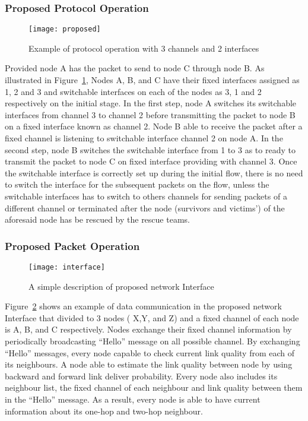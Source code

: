 \documentclass{article}
\begin{document}
\subsubsection{Proposed Protocol Operation}

\begin{center}
\begin{figure}[h]
\texttt{[image: proposed]}
\caption{Example of protocol operation with 3 channels and 2 interfaces}\label{proposed}
\end{figure}
\end{center}

Provided node A has the packet to send to node C through node B. As illustrated in Figure~\ref{proposed}, Nodes A, B, and C have their fixed interfaces assigned as 1, 2 and 3 and switchable interfaces on each of the nodes as 3, 1 and 2 respectively on the initial stage. In the first step, node A switches its switchable interfaces from channel 3 to channel 2 before transmitting the packet to node B on a fixed interface known as channel 2. Node B able to receive the packet after a fixed channel is listening to switchable interface channel 2 on node A. In the second step, node B switches the switchable interface from 1 to 3 as to ready to transmit the packet to node C on fixed interface providing with channel 3. Once the switchable interface is correctly set up during the initial flow, there is no need to switch the interface for the subsequent packets on the flow, unless the switchable interfaces has to switch to others channels for sending packets of a different channel or terminated after the node (survivors and victims’) of the aforesaid node has be rescued by the rescue teams. 

\subsubsection{Proposed Packet Operation}

\begin{center}
\begin{figure}[h]
\texttt{[image: interface]}
\caption{A simple description of proposed network Interface}\label{interface}
\end{figure}
\end{center}

Figure~\ref{interface} shows an example of data communication in the proposed network Interface that divided to 3 nodes ( X,Y, and Z) and a fixed channel of each node is A, B, and C respectively. Nodes exchange their fixed channel information by periodically broadcasting “Hello” message on all possible channel. By exchanging “Hello” messages, every node capable to check current link quality from each of its neighbours. A node able to estimate the link quality between node by using backward and forward link deliver probability. Every node also includes its neighbour list, the fixed channel of each neighbour and link quality between them in the “Hello” message. As a result, every node is able to have current information about its one-hop and two-hop neighbour.
\end{document}
